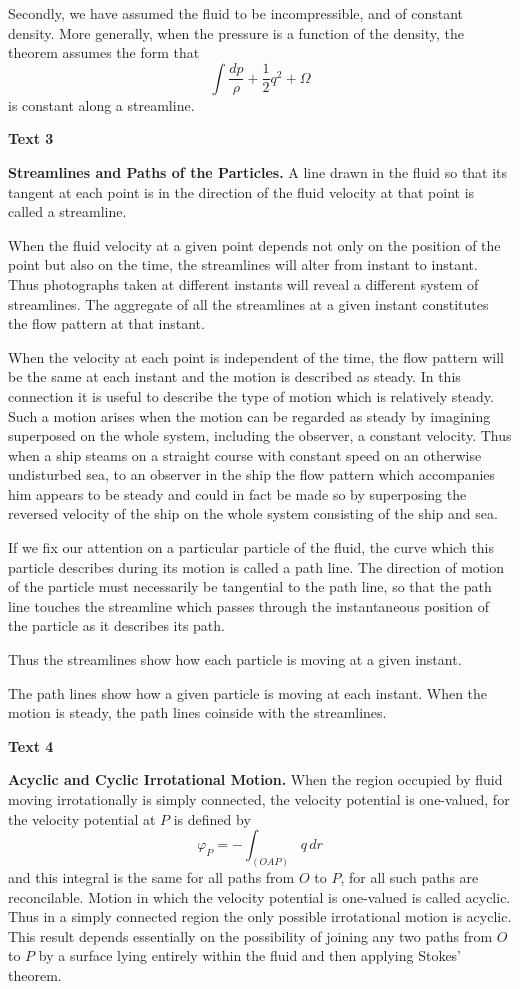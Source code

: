 \documentclass[a4paper]{article}
\newcommand{\ESect}[1]{\medskip\par{\large \textbf{#1}}\par}
\newcommand{\Eqn}[1]{\begin{equation}#1\end{equation}}
\begin{document}
Secondly, we have assumed the fluid to be incompressible, and of constant density. More generally, when the pressure is a
function of the density, the theorem assumes the form that
$$\int \frac{d p}{\rho}+\frac{1}{2}q^2+\Omega$$
is constant along a streamline.

\ESect{Text 3}
\textbf{Streamlines and Paths of the Particles.} A line drawn in the fluid so that its tangent at each point is in the direction
of the fluid velocity at that point is called a streamline.

When the fluid velocity at a given point depends not only on the position of the point but also on the time, the streamlines
will alter from instant to instant. Thus photographs taken at different instants will reveal a different system of streamlines.
The aggregate of all the streamlines at a given instant constitutes the flow pattern at that instant.

When the velocity at each point is independent of the time, the flow pattern will be the same at each instant and the motion is
described as steady. In this connection it is useful to describe the type of motion which is relatively steady. Such a motion
arises when the motion can be regarded as steady by imagining superposed on the whole system, including the observer, a
constant velocity. Thus when a ship steams on a straight course with constant speed on an otherwise undisturbed sea, to an
observer in the ship the flow pattern which accompanies him appears to be steady and could in fact be made so by superposing
the reversed velocity of the ship on the whole system consisting of the ship and sea.

If we fix our attention on a particular particle of the fluid, the curve which this particle describes during its motion is
called a path line. The direction of motion of the particle must necessarily be tangential to the path line, so that the path
line touches the streamline which passes through the instantaneous position of the particle as it describes its path.

Thus the streamlines show how each particle is moving at a given instant.

The path lines show how a given particle is moving at each instant. When the motion is steady, the path lines coinside with
the streamlines.

\setcounter{equation}{0}
\ESect{Text 4}
\textbf{Acyclic and Cyclic Irrotational Motion.} When the region occupied by fluid moving irrotationally is simply connected,
the velocity potential is one-valued, for the velocity potential at $P$ is defined by
\Eqn{\varphi_P=-\int_{(OAP)} q\, dr}
and this integral is the same for all paths from $O$ to $P$, for all such paths are reconcilable. Motion in which the velocity
potential is one-valued is called acyclic. Thus in a simply connected region the only possible irrotational motion is acyclic.
This result depends essentially on the possibility of joining any two paths from $O$ to $P$ by a surface lying entirely within
the fluid and then applying Stokes' theorem.
\end{document}

